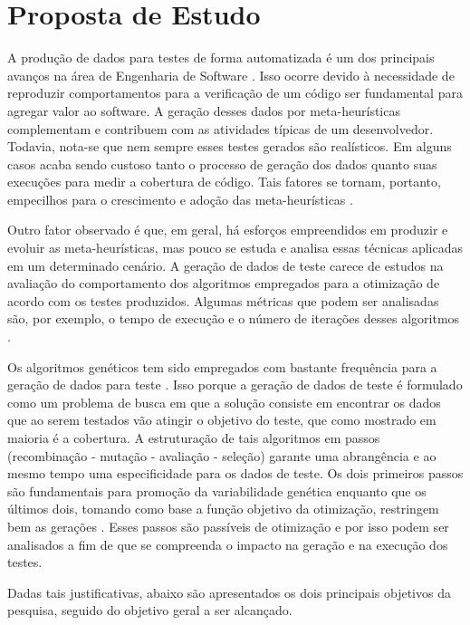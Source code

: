 \chapter[Proposta de Estudo]{Proposta de Estudo}
\label{propostaestudo}

A produção de dados para testes de forma automatizada é um dos principais avanços na área de Engenharia de Software \cite{harman2015achievements}. Isso ocorre devido à necessidade de reproduzir comportamentos para a verificação de um código ser fundamental para agregar valor ao software. A geração desses dados por meta-heurísticas complementam e contribuem com as atividades típicas de um desenvolvedor. Todavia, nota-se que nem sempre esses testes gerados são realísticos. Em alguns casos acaba sendo custoso tanto o processo de geração dos dados quanto suas execuções para medir a cobertura de código.  Tais fatores se tornam, portanto, empecilhos para o crescimento e adoção das meta-heurísticas \cite{harman2015achievements}.

Outro fator observado é que, em geral, há esforços empreendidos em produzir e evoluir as meta-heurísticas, mas pouco se estuda e analisa essas técnicas aplicadas em um determinado cenário. A geração de dados de teste carece de estudos na avaliação do comportamento dos algoritmos empregados para a otimização de acordo com os testes produzidos. Algumas métricas que podem ser analisadas são, por exemplo, o tempo de execução e o número de iterações desses algoritmos \cite{rodrigues2018using}. 

Os algoritmos genéticos tem sido empregados com bastante frequência para a geração de dados para teste \cite{rodrigues2018using}. Isso porque a geração de dados de teste é formulado como um problema de busca em que a solução consiste em encontrar os dados que ao serem testados vão atingir o objetivo do teste, que como mostrado em maioria é a cobertura. A estruturação de tais algoritmos em passos (recombinação - mutação - avaliação - seleção) garante uma abrangência e ao mesmo tempo uma especificidade para os dados de teste. Os dois primeiros passos são fundamentais para promoção da variabilidade genética enquanto que os últimos dois, tomando como base a função objetivo da otimização, restringem bem as gerações \cite{rodrigues2018using}. Esses passos são passíveis de otimização e por isso podem ser analisados a fim de que se compreenda o impacto na geração e na execução dos testes.

Dadas tais justificativas, abaixo são apresentados os dois principais objetivos da pesquisa, seguido do objetivo geral a ser alcançado. 

